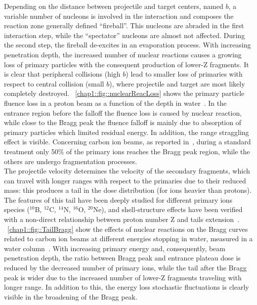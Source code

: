 Depending on the distance between projectile and target centers, named $b$, a variable number of nucleons is involved in the interaction and composes the reaction zone generally defined \enquote{fireball}. This nucleons are abraded in the first interaction step, while the \enquote{spectator} nucleons are almost not affected. During the second step, the fireball de-excites in an evaporation process. With increasing penetration depth, the increased number of nuclear reactions causes a growing loss of primary particles with the consequent production of lower-Z fragments. It is clear that peripheral collisions (high $b$) lead to smaller loss of primaries with respect to central collision (small $b$), where projectile and target are most likely completely destroyed. \figurename~\ref{chap1::fig::nuclearReacLoss} shows the primary particle fluence loss in a proton beam as a function of the depth in water~\parencite{Newhauser2015}. In the entrance region before the falloff the fluence loss is caused by nuclear reaction, while close to the Bragg peak the fluence falloff is mainly due to absorption of primary particles which limited residual energy. In addition, the range straggling effect is visible. Concerning carbon ion beams, as reported in~\cite{Durante2016}, during a standard treatment only 50\% of the primary ions reaches the Bragg peak region, while the others are undergo fragmentation processes.\\ 
The projectile velocity determines the velocity of the secondary fragments, which can travel with longer ranges with respect to the primaries due to their reduced mass: this produces a tail in the dose distribution (for ions heavier than protons). The features of this tail have been deeply studied for different primary ions species ($^{10}$B, $^{12}$C, $^{14}$N, $^{16}$O, $^{20}$Ne), and shell-structure effects have been verified with a non-direct relationship between proton number Z and tails extension~\parencite{Schall1996}.  \figurename~\ref{chap1::fig::TailBragg} show the effects of nuclear reactions on the Bragg curves related to carbon ion beams at different energies stopping in water, measured in a water column~\parencite{Schardt2008}.  With increasing primary energy and, consequently, beam penetration depth, the ratio between Bragg peak and entrance plateau dose is reduced by the decreased number of primary ions, while the tail after the Bragg peak is wider due to the increased number of lower-Z fragments traveling with longer range. In addition to this, the energy loss stochastic fluctuations is clearly visible in the broadening of the Bragg peak.  


